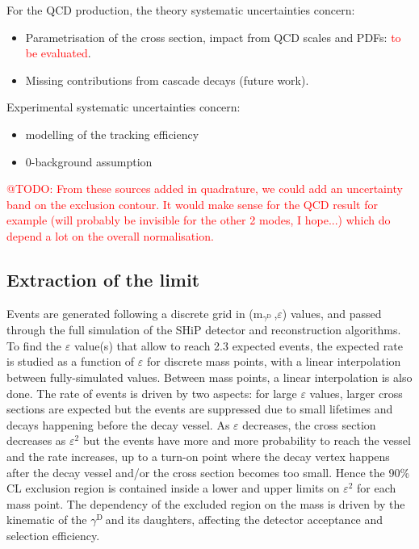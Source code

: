 \documentclass[12pt,a4paper]{article}
\newcommand{\mathDP}{\gamma^{\mathrm{D}}\ }
\newcommand{\DP}{$\mathDP$}
\newcommand{\mDP}{m$_{\mathDP}$}
\begin{document}
For the QCD production, the theory systematic uncertainties concern:
\begin{itemize}
\item Parametrisation of the cross section, impact from QCD scales and
  PDFs: \textcolor{red}{to be evaluated}.
\item Missing contributions from cascade decays (future work).
\end{itemize}

Experimental systematic uncertainties concern:
\begin{itemize}
\item modelling of the tracking efficiency
\item 0-background assumption
\end{itemize}


\textcolor{red}{@TODO: From these sources added in quadrature, we
  could add an uncertainty band on the exclusion contour. It would
  make sense for the QCD result for example (will probably be
  invisible for the other 2 modes, I hope...)  which do depend a lot
  on the overall normalisation. }

\subsection{Extraction of the limit}

Events are generated following a discrete grid in (\mDP,$\varepsilon$)
values, and passed through the full simulation of the SHiP detector
and reconstruction algorithms. To find the $\varepsilon$ value(s) that
allow to reach 2.3 expected events, the expected rate is studied as a
function of $\varepsilon$ for discrete mass points, with a linear
interpolation between fully-simulated values. Between mass points, a
linear interpolation is also done. The rate of events is driven by two
aspects: for large $\varepsilon$ values, larger cross sections are
expected but the events are suppressed due to small lifetimes and
decays happening before the decay vessel. As $\varepsilon$ decreases,
the cross section decreases as $\varepsilon^2$ but the events have
more and more probability to reach the vessel and the rate increases,
up to a turn-on point where the decay vertex happens after the decay
vessel and/or the cross section becomes too small. Hence the 90\% CL
exclusion region is contained inside a lower and upper limits on
$\varepsilon^2$ for each mass point. The dependency of the excluded
region on the mass is driven by the kinematic of the \DP and its
daughters, affecting the detector acceptance and selection efficiency.
\end{document}
